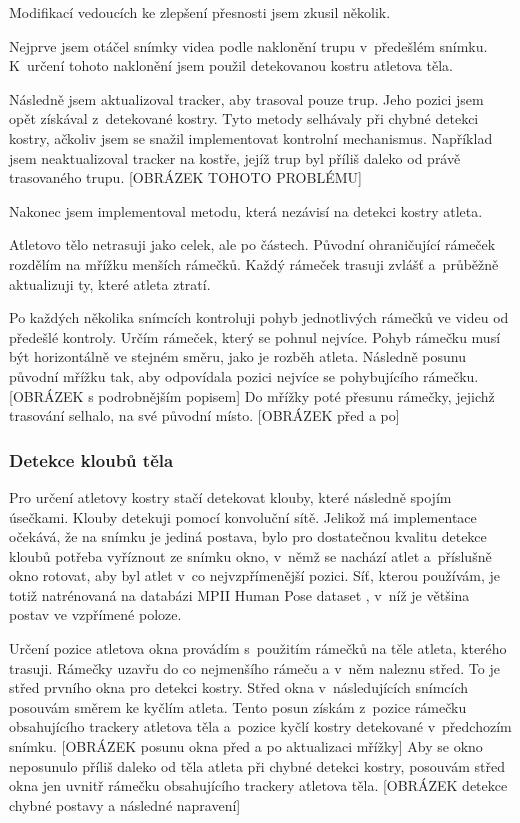 Modifikací vedoucích ke zlepšení přesnosti jsem zkusil několik.

Nejprve jsem otáčel snímky videa podle naklonění trupu v~předešlém snímku. K~určení tohoto naklonění jsem použil detekovanou kostru atletova těla.

Následně jsem aktualizoval tracker, aby trasoval pouze trup. Jeho pozici jsem opět získával z~detekované kostry. Tyto metody selhávaly při chybné detekci kostry, ačkoliv jsem se snažil implementovat kontrolní mechanismus. Například jsem neaktualizoval tracker na kostře, jejíž trup byl příliš daleko od právě trasovaného trupu. [OBRÁZEK TOHOTO PROBLÉMU]

Nakonec jsem implementoval metodu, která nezávisí na detekci kostry atleta.

Atletovo tělo netrasuji jako celek, ale po částech. Původní ohraničující rámeček rozdělím na mřížku menších rámečků. Každý rámeček trasuji zvlášť a~průběžně aktualizuji ty, které atleta ztratí.

Po každých několika snímcích kontroluji pohyb jednotlivých rámečků ve videu od předešlé kontroly. Určím rámeček, který se pohnul nejvíce. Pohyb rámečku musí být horizontálně ve stejném směru, jako je rozběh atleta. Následně posunu původní mřížku tak, aby odpovídala pozici nejvíce se pohybujícího rámečku. [OBRÁZEK s podrobnějším popisem] Do mřížky poté přesunu rámečky, jejichž trasování selhalo, na své původní místo. [OBRÁZEK před a po]


\subsubsection{Detekce kloubů těla}

Pro určení atletovy kostry stačí detekovat klouby, které následně spojím úsečkami. Klouby detekuji pomocí konvoluční sítě. Jelikož má implementace očekává, že na snímku je jediná postava, bylo pro dostatečnou kvalitu detekce kloubů potřeba vyříznout ze snímku okno, v~němž se nachází atlet a~příslušně okno rotovat, aby byl atlet v~co nejvzpřímenější pozici. Síť, kterou používám, je totiž natrénovaná na databázi MPII Human Pose dataset \citep{MPIIHPE}, v~níž je většina postav ve vzpřímené poloze.

Určení pozice atletova okna provádím s~použitím rámečků na těle atleta, kterého trasuji. Rámečky uzavřu do co nejmenšího rámeču a v~něm naleznu střed. To je střed prvního okna pro detekci kostry. Střed okna v~následujících snímcích posouvám směrem ke kyčlím atleta. Tento posun získám z~pozice rámečku obsahujícího trackery atletova těla a~pozice kyčlí kostry detekované v~předchozím snímku. [OBRÁZEK posunu okna před a po aktualizaci mřížky] Aby se okno neposunulo příliš daleko od těla atleta při chybné detekci kostry, posouvám střed okna jen uvnitř rámečku obsahujícího trackery atletova těla. [OBRÁZEK detekce chybné postavy a následné napravení]

